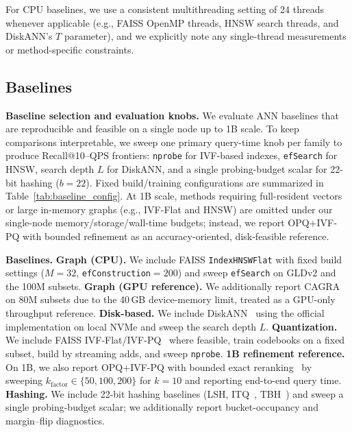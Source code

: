 \documentclass[sigconf, nonacm]{acmart}
\begin{document}
For CPU baselines, we use a consistent multithreading setting of 24 threads whenever applicable
(e.g., FAISS OpenMP threads, HNSW search threads, and DiskANN's $T$ parameter),
and we explicitly note any single-thread measurements or method-specific constraints.



\subsection{Baselines}
\label{subsec:baselines}

\textbf{Baseline selection and evaluation knobs.}
We evaluate ANN baselines that are reproducible and feasible on a single node up to 1B scale.
To keep comparisons interpretable, we sweep one primary query-time knob per family to produce Recall@10--QPS frontiers:
\texttt{nprobe} for IVF-based indexes, \texttt{efSearch} for HNSW, search depth $L$ for DiskANN, and a single probing-budget scalar for 22-bit hashing ($b=22$).
Fixed build/training configurations are summarized in Table~\ref{tab:baseline_config}.
At 1B scale, methods requiring full-resident vectors or large in-memory graphs (e.g., IVF-Flat and HNSW) are omitted under our single-node memory/storage/wall-time budgets; instead, we report OPQ+IVF-PQ with bounded refinement as an accuracy-oriented, disk-feasible reference.

\noindent\textbf{Baselines.}
\textbf{Graph (CPU).} We include FAISS \texttt{IndexHNSWFlat} with fixed build settings ($M{=}32$, \texttt{efConstruction}$=200$) and sweep \texttt{efSearch} on GLDv2 and the 100M subsets.
\textbf{Graph (GPU reference).} We additionally report CAGRA~\cite{ootomo2024cagrahighlyparallelgraph} on 80M subsets due to the 40\,GB device-memory limit, treated as a GPU-only throughput reference.
\textbf{Disk-based.} We include DiskANN~\cite{NEURIPS2019_09853c7f} using the official implementation on local NVMe and sweep the search depth $L$.
\textbf{Quantization.} We include FAISS IVF-Flat/IVF-PQ~\cite{johnson2017billionscalesimilaritysearchgpus,5432202} where feasible, train codebooks on a fixed subset, build by streaming adds, and sweep \texttt{nprobe}.
\textbf{1B refinement reference.} On 1B, we also report OPQ+IVF-PQ with bounded exact reranking~\cite{6678503,5432202} by sweeping $k_{\text{factor}}\in\{50,100,200\}$ for $k=10$ and reporting end-to-end query time.
\textbf{Hashing.} We include 22-bit hashing baselines (LSH, ITQ~\cite{itq}, TBH~\cite{tbh}) and sweep a single probing-budget scalar; we additionally report bucket-occupancy and margin--flip diagnostics.
\end{document}
